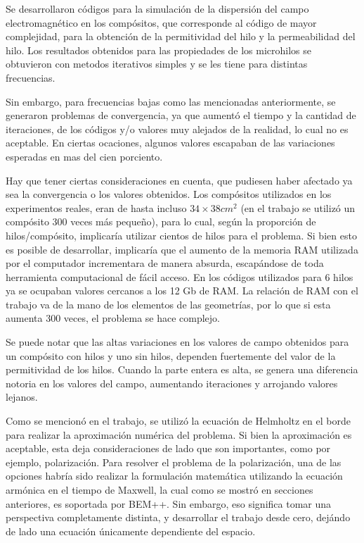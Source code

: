 \documentclass[12pt,letterpaper]{article}
\numberwithin{equation}{section}
\begin{document}
Se desarrollaron códigos para la simulación de la dispersión del campo electromagnético en los compósitos, que corresponde al código de mayor complejidad, para la obtención de la permitividad del hilo y la permeabilidad del hilo. Los resultados obtenidos para las propiedades de los microhilos se obtuvieron con metodos iterativos simples y se les tiene para distintas frecuencias.

Sin embargo, para frecuencias bajas como las mencionadas anteriormente, se generaron problemas de convergencia, ya que aumentó el tiempo y la cantidad de iteraciones, de los códigos y/o valores muy alejados de la realidad, lo cual no es aceptable. En ciertas ocaciones, algunos valores escapaban de las variaciones esperadas en mas del cien porciento. 

Hay que tener ciertas consideraciones en cuenta, que pudiesen haber afectado ya sea la convergencia o los valores obtenidos. Los compósitos utilizados en los experimentos reales, eran de hasta incluso $34 \times 38 cm^2$ (en el trabajo se utilizó un compósito 300 veces más pequeño), para lo cual, según la proporción de hilos/compósito, implicaría utilizar cientos de hilos para el problema. Si bien esto es posible de desarrollar, implicaría que el aumento de la memoria RAM utilizada por el computador incrementara de manera absurda, escapándose de toda herramienta computacional de fácil acceso. En los códigos utilizados para 6 hilos ya se ocupaban valores cercanos a los 12 Gb de RAM. La relación de RAM con el trabajo va de la mano de los elementos de las geometrías, por lo que si esta aumenta 300 veces, el problema se hace complejo.

Se puede notar que las altas variaciones en los valores de campo obtenidos para un compósito con hilos y uno sin hilos, dependen fuertemente del valor de la permitividad de los hilos. Cuando la parte entera es alta, se genera una diferencia notoria en los valores del campo, aumentando iteraciones y arrojando valores lejanos.

Como se mencionó en el trabajo, se utilizó la ecuación de Helmholtz en el borde para realizar la aproximación numérica del problema. Si bien la aproximación es aceptable, esta deja consideraciones de lado que son importantes, como por ejemplo, polarización. Para resolver el problema de la polarización, una de las opciones habría sido realizar la formulación matemática utilizando la ecuación armónica en el tiempo de Maxwell, la cual como se mostró en secciones anteriores, es soportada por BEM++. Sin embargo, eso significa tomar una perspectiva completamente distinta, y desarrollar el trabajo desde cero, dejándo de lado una ecuación únicamente dependiente del espacio.
\end{document}
